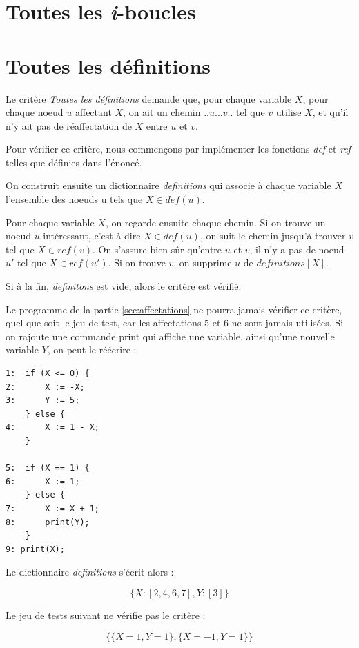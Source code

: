\documentclass[a4paper, 12pt]{report}
\begin{document}
\section{Toutes les \textit{i}-boucles}
\section{Toutes les définitions}

Le critère \textit{Toutes les définitions} demande que, pour chaque variable $X$, pour chaque noeud $u$ affectant $X$, on ait un chemin $..u...v..$ tel que $v$ utilise $X$, et qu'il n'y ait pas de réaffectation de $X$ entre $u$ et $v$.

Pour vérifier ce critère, nous commençons par implémenter les fonctions \textit{def} et \textit{ref} telles que définies dans l'énoncé.

On construit ensuite un dictionnaire \textit{definitions} qui associe à chaque variable $X$ l'ensemble des noeuds u tels que $X \in def(u)$.

Pour chaque variable $X$, on regarde ensuite chaque chemin. Si on trouve un noeud $u$ intéressant, c'est à dire $X \in def(u)$, on suit le chemin jusqu'à trouver $v$ tel que $X \in ref(v)$. On s'assure bien sûr qu'entre $u$ et $v$, il n'y a pas de noeud $u'$ tel que $X \in ref(u')$. Si on trouve $v$, on supprime $u$ de $\textit{definitions}[X]$.

Si à la fin, \textit{definitons} est vide, alors le critère est vérifié.

Le programme de la partie \ref{sec:affectations} ne pourra jamais vérifier ce critère, quel que soit le jeu de test, car les affectations $5$ et $6$ ne sont jamais utilisées. Si on rajoute une commande print qui affiche une variable, ainsi qu'une nouvelle variable $Y$, on peut le réécrire :


\begin{verbatim}
1:  if (X <= 0) {
2:      X := -X;
3:		Y := 5;
    } else {
4:      X := 1 - X;
    }

5:  if (X == 1) {
6:      X := 1;
    } else {
7:      X := X + 1;
8:		print(Y);
    }
9: print(X);
\end{verbatim}

Le dictionnaire \textit{definitions} s'écrit alors :

\[ \{
	X : [2, 4, 6, 7],
	Y : [3]
\} \]

Le jeu de tests suivant ne vérifie pas le critère :

\[ \{
	\{ X=1, Y=1\},
	\{ X=-1, Y=1 \}
\} \]
\end{document}
